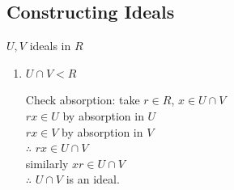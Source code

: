 \subsection*{Constructing Ideals} $U,V$ ideals in $R$
\begin{enumerate}
    \item $U\cap V < R$\steezybreak

    \noindent Check absorption: take $r\in R$, $x\in U\cap V$\\
    $rx\in U$ by absorption in $U$\\
    $rx\in V$ by absorption in $V$\\
    $\therefore$ $rx\in U\cap V$\\
    similarly $xr \in U \cap V$ \\
    $\therefore$ $U\cap V$ is an ideal.


\end{enumerate}
